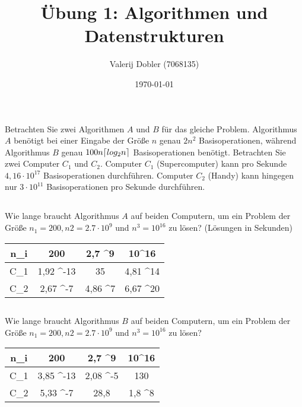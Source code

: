 \documentclass[12pt]{article}
\title{Übung 1: Algorithmen und Datenstrukturen}
\author{Valerij Dobler (7068135)}
\date{\today}
\theoremstyle{remark}
\DeclarePairedDelimiter\ceil{\lceil}{\rceil}
\begin{document}
\maketitle

\section{}

Betrachten Sie zwei Algorithmen $A$ und $B$ für das gleiche Problem. Algorithmus $A$ benötigt bei einer Eingabe der Größe $n$ genau $2n^2$ Basisoperationen, während Algorithmus $B$ genau $100n \ceil{ log_2 n}$ Basisoperationen benötigt. Betrachten Sie zwei Computer $C_1$ und $C_2$. Computer $C_1$ (Supercomputer) kann pro Sekunde $4,16 \cdot 10^{17}$ Basisoperationen durchführen. Computer $C_2$ (Handy) kann hingegen nur $3 \cdot 10^{11}$ Basisoperationen pro Sekunde durchführen.

\subsection{}

Wie lange braucht Algorithmus $A$ auf beiden Computern, um ein Problem der Größe $n_1 = 200, n2 = 2.7 \cdot 10^9$ und $n^3 = 10^{16}$ zu lösen? (Lösungen in Sekunden)

\begin{center}
    \begin{tabular}{C|C|C|C}
        n_i & 200 & 2,7 ^9 & 10^{16} \\ \hline
        C_1 &  1,92 ^{-13} &  35 &  4,81 ^{14} \\ \hline
        C_2 &  2,67 ^{-7} & 4,86 ^7 &  6,67 ^{20} \\
    \end{tabular}
\end{center}


\subsection{}

Wie lange braucht Algorithmus $B$ auf beiden Computern, um ein Problem der Größe $n_1 = 200, n2 = 2.7 \cdot 10^9$ und $n^3 = 10^{16}$ zu lösen?

\begin{center}
    \begin{tabular}{C|C|C|C}
        n_i & 200 & 2,7 ^9 & 10^{16} \\ \hline
        C_1 &  3,85 ^{-13} &  2,08 ^-5  &  130 \\ \hline
        C_2 &  5,33 ^{-7} & 28,8 & 1,8 ^{8} \\
    \end{tabular}
\end{center}
\end{document}
